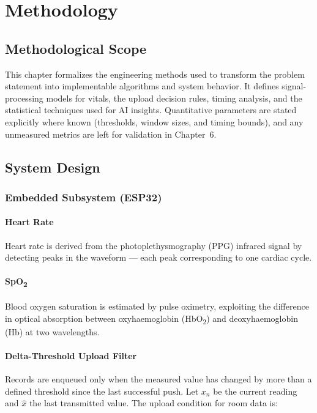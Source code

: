 \chapter{Methodology}

\section{Methodological Scope}
This chapter formalizes the engineering methods used to transform the problem statement into implementable algorithms and system behavior. It defines signal-processing models for vitals, the upload decision rules, timing analysis, and the statistical techniques used for AI insights. Quantitative parameters are stated explicitly where known (thresholds, window sizes, and timing bounds), and any unmeasured metrics are left for validation in Chapter~6.

\section{System Design}

\subsection{Embedded Subsystem (ESP32\texorpdfstring{\cite{esp32_datasheet}}{})}

\subsubsection{Heart Rate}

Heart rate is derived from the photoplethysmography (PPG) infrared signal by detecting
peaks in the waveform — each peak corresponding to one cardiac cycle.

\subsubsection{SpO\texorpdfstring{\textsubscript{2}}{2}}

Blood oxygen saturation is estimated by pulse oximetry, exploiting the difference in
optical absorption between oxyhaemoglobin (HbO\textsubscript{2}) and deoxyhaemoglobin
(Hb) at two wavelengths.

\subsubsection{Delta-Threshold Upload Filter}

Records are enqueued only when the measured value has changed by more than a defined
threshold since the last successful push.
Let $x_n$ be the current reading and $\hat{x}$ the last transmitted value.
The upload condition for room data is:


